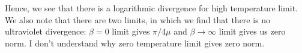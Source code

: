\documentclass[11pt,a4paper]{article}
\begin{document}
Hence, we see that there is a logarithmic divergence for high temperature limit. We also note that there are two limits, in which we find that there is no ultraviolet divergence: $\beta =0$ limit gives $\pi/ 4 \mu$ and $\beta \rightarrow \infty$ limit gives us zero norm. I don't understand why zero temperature limit gives zero norm.




\appendix




 


\end{document}
